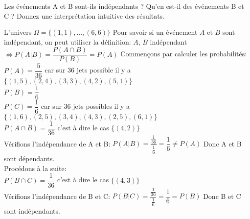 \begin{exo}
  \begin{subexo}{Les événements A et B sont-ils indépendants ? Qu’en est-il des événements B et C ? Donnez une interprétation intuitive des résultats.}
    \begin{flushleft}
      L'univers $\Omega = \{(1,1),...,(6,6)\}$ Pour savoir si un événement $A$ et $B$ sont indépendant, on peut utiliser la définition: $A$, $B$ indépendant $\Leftrightarrow P(A | B) = \dfrac{P(A \cap B)}{P(B)}=P(A)$ Commençons par calculer les probabilités:
      \\$P(A) = \dfrac{5}{36}$ car sur 36 jets possible il y a $\{(1,5),(2,4),(3,3),(4,2),(5,1)\}$
      \\$P(B) = \dfrac{1}{6}$
      \\$P(C) = \dfrac{1}{6}$ car sur 36 jets possibles il y a $\{(1,6),(2,5),(3,4),(4,3),(2,5),(6,1)\}$
      \\$P(A \cap B) = \dfrac{1}{36}$ c'est à dire le cas $\{(4,2)\}$
      \\Vérifions l'indépendance de A et B: $P(A | B) = \dfrac{\frac{1}{36}}{\frac{1}{6}}=\dfrac{1}{6} \neq P(A)$ Donc A et B sont dépendants.
      \\ Procédons à la suite:
      \\$P(B\cap C) = \dfrac{1}{36}$ c'est à dire le cas $\{(4,3)\}$
      \\Vérifions l'indépendance de B et C: $P(B | C) = \dfrac{\frac{1}{36}}{\frac{1}{6}}=\dfrac{1}{6} = P(B)$ Donc B et C sont indépendants.
    \end{flushleft}
  \end{subexo}
\end{exo}
